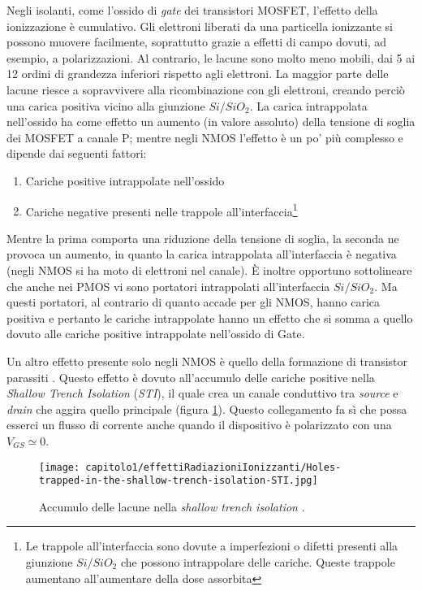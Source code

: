 Negli isolanti, come l'ossido di \emph{gate} dei transistori MOSFET, l'effetto della ionizzazione è cumulativo. Gli elettroni liberati da una particella ionizzante si possono muovere facilmente, soprattutto grazie a effetti di campo dovuti, ad esempio, a polarizzazioni.
Al contrario, le lacune sono molto meno mobili, dai 5 ai 12 ordini di grandezza inferiori rispetto agli elettroni. La maggior parte delle lacune riesce a sopravvivere alla ricombinazione con gli elettroni, creando perciò una carica positiva vicino alla giunzione $Si/SiO_2$.
La carica intrappolata nell'ossido ha come effetto un aumento (in valore assoluto) della tensione di soglia dei MOSFET a canale P; mentre negli NMOS l'effetto è un po' più complesso e dipende dai seguenti fattori:
\begin{enumerate}
	\item Cariche positive intrappolate nell'ossido
	\item Cariche negative presenti nelle trappole all'interfaccia\footnote{Le trappole all'interfaccia sono dovute a imperfezioni o difetti presenti alla giunzione $Si/SiO_2$ che possono intrappolare delle cariche. Queste trappole aumentano all'aumentare della dose assorbita}
\end{enumerate}
Mentre la prima comporta una riduzione della tensione di soglia, la seconda ne provoca un aumento, in quanto la carica intrappolata all'interfaccia è negativa (negli NMOS si ha moto di elettroni nel canale). 
È inoltre opportuno sottolineare che anche nei PMOS vi sono portatori intrappolati all'interfaccia $Si/SiO_2$. Ma questi portatori, al contrario di quanto accade per gli NMOS, hanno carica positiva e pertanto le cariche intrappolate hanno un effetto che si somma a quello dovuto alle cariche positive intrappolate nell'ossido di Gate.  

\vspace{0.5cm}

Un altro effetto presente solo negli NMOS è quello della formazione di transistor parassiti \cite{effetti_radiazioni:CMOS_IC_radiation_hardening_by_design}. Questo effetto è dovuto all'accumulo delle cariche positive nella \textit{Shallow Trench Isolation} (\textit{STI}), il quale crea un canale conduttivo tra \emph{source} e \emph{drain} che aggira quello principale (figura \ref{fig:accumulo_lacune_STI}). Questo collegamento fa sì che possa esserci un flusso di corrente anche quando il dispositivo è polarizzato con una $V_{GS} \simeq 0$.

\begin{figure}[ht]
	\centering

	\texttt{[image: capitolo1/effettiRadiazioniIonizzanti/Holes-trapped-in-the-shallow-trench-isolation-STI.jpg]}

	\caption[Lacune nella \textit{STI}]{Accumulo delle lacune nella \textit{shallow trench isolation} \cite{effetti_radiazioni:CMOS_IC_radiation_hardening_by_design}.}
	\label{fig:accumulo_lacune_STI}

\end{figure}


